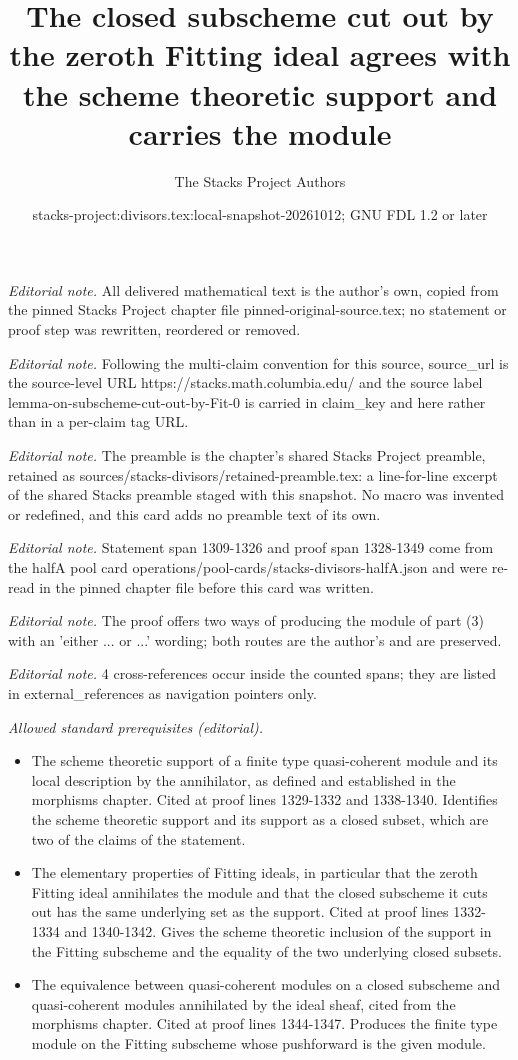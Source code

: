 \documentclass[10pt,a4paper]{amsart}
\title{The closed subscheme cut out by the zeroth Fitting ideal agrees with the scheme theoretic support and carries the module}
\author{The Stacks Project Authors}
\date{stacks-project:divisors.tex:local-snapshot-20261012; GNU FDL 1.2 or later}
\theoremstyle{plain}
\theoremstyle{definition}
\theoremstyle{remark}
\numberwithin{equation}{subsection}
\begin{document}
\maketitle
\noindent\textit{Editorial note.} All delivered mathematical text is the author's own, copied from the pinned Stacks Project chapter file pinned-original-source.tex; no statement or proof step was rewritten, reordered or removed.\par\medskip
\noindent\textit{Editorial note.} Following the multi-claim convention for this source, source\_url is the source-level URL https://stacks.math.columbia.edu/ and the source label lemma-on-subscheme-cut-out-by-Fit-0 is carried in claim\_key and here rather than in a per-claim tag URL.\par\medskip
\noindent\textit{Editorial note.} The preamble is the chapter's shared Stacks Project preamble, retained as sources/stacks-divisors/retained-preamble.tex: a line-for-line excerpt of the shared Stacks preamble staged with this snapshot. No macro was invented or redefined, and this card adds no preamble text of its own.\par\medskip
\noindent\textit{Editorial note.} Statement span 1309-1326 and proof span 1328-1349 come from the halfA pool card operations/pool-cards/stacks-divisors-halfA.json and were re-read in the pinned chapter file before this card was written.\par\medskip
\noindent\textit{Editorial note.} The proof offers two ways of producing the module of part (3) with an 'either ... or ...' wording; both routes are the author's and are preserved.\par\medskip
\noindent\textit{Editorial note.} 4 cross-references occur inside the counted spans; they are listed in external\_references as navigation pointers only.\par\medskip
\noindent\textit{Allowed standard prerequisites (editorial).}\begin{itemize}
\item The scheme theoretic support of a finite type quasi-coherent module and its local description by the annihilator, as defined and established in the morphisms chapter. Cited at proof lines 1329-1332 and 1338-1340. Identifies the scheme theoretic support and its support as a closed subset, which are two of the claims of the statement.
\item The elementary properties of Fitting ideals, in particular that the zeroth Fitting ideal annihilates the module and that the closed subscheme it cuts out has the same underlying set as the support. Cited at proof lines 1332-1334 and 1340-1342. Gives the scheme theoretic inclusion of the support in the Fitting subscheme and the equality of the two underlying closed subsets.
\item The equivalence between quasi-coherent modules on a closed subscheme and quasi-coherent modules annihilated by the ideal sheaf, cited from the morphisms chapter. Cited at proof lines 1344-1347. Produces the finite type module on the Fitting subscheme whose pushforward is the given module.
\end{itemize}\medskip
\end{document}
